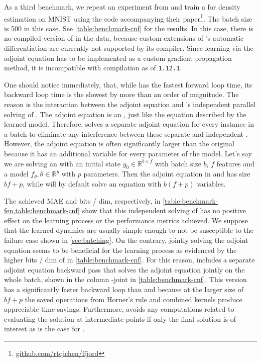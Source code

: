 \documentclass{article}
\newcommand\version[1]{\texttt{#1}}
\begin{document}
As a third benchmark, we repeat an experiment from \citep{grathwohl2019ffjord} and train a \cnf{} for density estimation on MNIST using the code accompanying their paper\footnote{\href{https://github.com/rtqichen/ffjord}{github.com/rtqichen/ffjord}}. The batch size is \num{500} in this case. See \cref{table:benchmark-cnf} for the results. In this case, there is no \jit{} compiled version of \torchode{} in the data, because custom extensions of \pytorch{}'s automatic differentiation are currently not supported by its \jit{} compiler. Since learning via the adjoint equation \citep{chen2018neural} has to be implemented as a custom gradient propagation method, it is incompatible with \jit{} compilation as of \pytorch{} \version{1.12.1}.

One should notice immediately, that, while \torchode{} has the fastest forward loop time, its backward loop time is the slowest by more than an order of magnitude. The reason is the interaction between the adjoint equation and \torchode{}'s independent parallel solving of \ODEs{}. The adjoint equation is an \ODE{}, just like the equation described by the learned model. Therefore, \torchode{} solves a separate adjoint equation for every instance in a batch to eliminate any interference between these separate and independent \ODEs{}. However, the adjoint equation is often significantly larger than the original \ODE{} because it has an additional variable for every parameter of the model. Let's say we are solving an \ODE{} with an initial state $y_{0} \in \mathbb{R}^{b \times f}$ with batch size $b$, $f$ features and a model $f_{\theta}, \theta \in \mathbb{R}^{p}$ with $p$ parameters. Then the adjoint equation in \torchdyn{} and \torchdiffeq{} has size $bf + p$, while \torchode{} will by default solve an equation with $b(f + p)$ variables.

The achieved MAE and bits / dim, respectively, in \cref{table:benchmark-fen,table:benchmark-cnf} show that this independent solving of \ODEs{} has no positive effect on the learning process or the performance metrics achieved. We suppose that the learned dynamics are usually simple enough to not be susceptible to the failure case shown in \cref{sec:batching}. On the contrary, jointly solving the adjoint equation seems to be beneficial for the learning process as evidenced by the higher bits / dim of \torchode{} in \cref{table:benchmark-cnf}. For this reason, \torchode{} includes a separate adjoint equation backward pass that solves the adjoint equation jointly on the whole batch, shown in the column \torchode{}-joint in \cref{table:benchmark-cnf}. This version has a significantly faster backward loop than \torchdiffeq{} and \torchdyn{} because at the larger \ODE{} size of $bf + p$ the saved operations from Horner's rule and combined kernels produce appreciable time savings. Furthermore, \torchode{} avoids any computations related to evaluating the solution at intermediate points if only the final solution is of interest as is the case for \cnfs{}.
\end{document}
